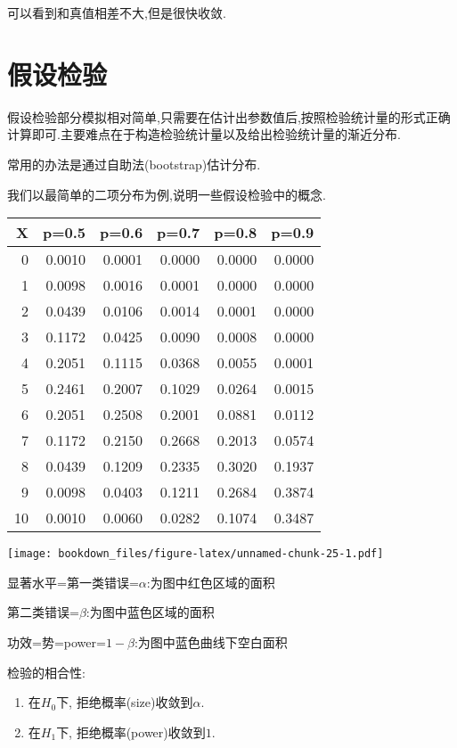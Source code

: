 \documentclass[]{ctexbook}
\providecommand{\tightlist}{%
  \setlength{\itemsep}{0pt}\setlength{\parskip}{0pt}}
\begin{document}
可以看到和真值相差不大,但是很快收敛.

\hypertarget{section-10}{%
\chapter{假设检验}\label{section-10}}

假设检验部分模拟相对简单,只需要在估计出参数值后,按照检验统计量的形式正确计算即可.主要难点在于构造检验统计量以及给出检验统计量的渐近分布.

常用的办法是通过自助法(bootstrap)估计分布.

我们以最简单的二项分布为例,说明一些假设检验中的概念.

\begin{tabular}{r|r|r|r|r|r}
\hline
X & p=0.5 & p=0.6 & p=0.7 & p=0.8 & p=0.9\\
\hline
0 & 0.0010 & 0.0001 & 0.0000 & 0.0000 & 0.0000\\
\hline
1 & 0.0098 & 0.0016 & 0.0001 & 0.0000 & 0.0000\\
\hline
2 & 0.0439 & 0.0106 & 0.0014 & 0.0001 & 0.0000\\
\hline
3 & 0.1172 & 0.0425 & 0.0090 & 0.0008 & 0.0000\\
\hline
4 & 0.2051 & 0.1115 & 0.0368 & 0.0055 & 0.0001\\
\hline
5 & 0.2461 & 0.2007 & 0.1029 & 0.0264 & 0.0015\\
\hline
6 & 0.2051 & 0.2508 & 0.2001 & 0.0881 & 0.0112\\
\hline
7 & 0.1172 & 0.2150 & 0.2668 & 0.2013 & 0.0574\\
\hline
8 & 0.0439 & 0.1209 & 0.2335 & 0.3020 & 0.1937\\
\hline
9 & 0.0098 & 0.0403 & 0.1211 & 0.2684 & 0.3874\\
\hline
10 & 0.0010 & 0.0060 & 0.0282 & 0.1074 & 0.3487\\
\hline
\end{tabular}

\texttt{[image: bookdown\_files/figure-latex/unnamed-chunk-25-1.pdf]}

显著水平=第一类错误=\(\alpha\):为图中红色区域的面积

第二类错误=\(\beta\):为图中蓝色区域的面积

功效=势=power=\(1- \beta\):为图中蓝色曲线下空白面积

检验的相合性:

\begin{enumerate}
\def\labelenumi{\arabic{enumi}.}
\tightlist
\item
  在\(H_0\)下, 拒绝概率(size)收敛到\(\alpha.\)
\item
  在\(H_1\)下, 拒绝概率(power)收敛到\(1.\)
\end{enumerate}
\end{document}
